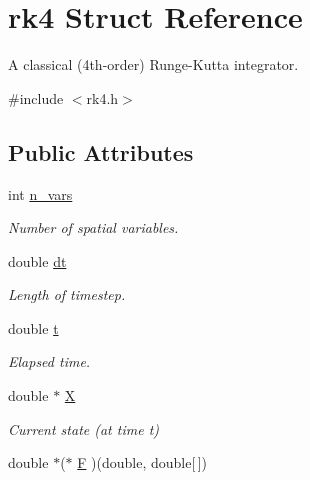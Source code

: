 \hypertarget{structrk4}{\section{rk4 Struct Reference}
\label{structrk4}
}


A classical (4th-\/order) Runge-\/\-Kutta integrator.  




{\ttfamily \#include $<$rk4.\-h$>$}

\subsection*{Public Attributes}
\begin{DoxyCompactItemize}
\item 
\hypertarget{structrk4_a1771335b8075b6c2bc2f7f365ece307b}{int \hyperlink{structrk4_a1771335b8075b6c2bc2f7f365ece307b}{n\-\_\-vars}}\label{structrk4_a1771335b8075b6c2bc2f7f365ece307b}

\begin{DoxyCompactList}\small\item\em Number of spatial variables. \end{DoxyCompactList}\item 
\hypertarget{structrk4_a79622109dfc5eecf546f51828768d70e}{double \hyperlink{structrk4_a79622109dfc5eecf546f51828768d70e}{dt}}\label{structrk4_a79622109dfc5eecf546f51828768d70e}

\begin{DoxyCompactList}\small\item\em Length of timestep. \end{DoxyCompactList}\item 
\hypertarget{structrk4_ab1179e509c8df420d8d9f89af1a842d3}{double \hyperlink{structrk4_ab1179e509c8df420d8d9f89af1a842d3}{t}}\label{structrk4_ab1179e509c8df420d8d9f89af1a842d3}

\begin{DoxyCompactList}\small\item\em Elapsed time. \end{DoxyCompactList}\item 
\hypertarget{structrk4_acdd11c2d23e608d1a5b59b001c29e3fe}{double $\ast$ \hyperlink{structrk4_acdd11c2d23e608d1a5b59b001c29e3fe}{X}}\label{structrk4_acdd11c2d23e608d1a5b59b001c29e3fe}

\begin{DoxyCompactList}\small\item\em Current state (at time t) \end{DoxyCompactList}\item 
\hypertarget{structrk4_a18efcbdf65c3b3c6409fddb26fdeb85b}{double $\ast$($\ast$ \hyperlink{structrk4_a18efcbdf65c3b3c6409fddb26fdeb85b}{F} )(double, double\mbox{[}$\,$\mbox{]})}\label{structrk4_a18efcbdf65c3b3c6409fddb26fdeb85b}


\end{DoxyCompactItemize}
